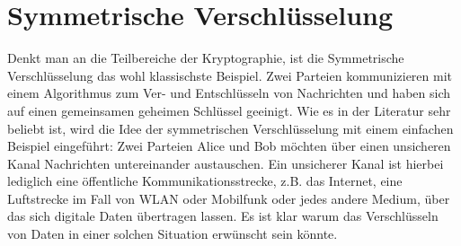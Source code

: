 \section{Symmetrische Verschlüsselung}
Denkt man an die Teilbereiche der Kryptographie, ist die Symmetrische Verschlüsselung
das wohl klassischste Beispiel. Zwei Parteien kommunizieren mit einem
Algorithmus zum Ver- und Entschlüsseln von Nachrichten und haben sich auf einen
gemeinsamen geheimen Schlüssel geeinigt. Wie es in der Literatur sehr beliebt ist,
wird die Idee der symmetrischen Verschlüsselung
mit einem einfachen Beispiel eingeführt:
Zwei Parteien Alice und Bob möchten über einen unsicheren Kanal Nachrichten untereinander austauschen.
Ein unsicherer Kanal ist hierbei lediglich eine öffentliche Kommunikationsstrecke,
z.B. das Internet, eine Luftstrecke im Fall von WLAN oder Mobilfunk oder jedes andere Medium,
über das sich digitale Daten übertragen lassen. Es ist klar warum das Verschlüsseln von
Daten in einer solchen Situation erwünscht sein könnte.

